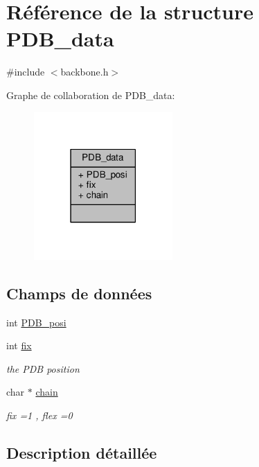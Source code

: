 \hypertarget{struct_p_d_b__data}{\section{Référence de la structure P\+D\+B\+\_\+data}
\label{struct_p_d_b__data}
}


{\ttfamily \#include $<$backbone.\+h$>$}



Graphe de collaboration de P\+D\+B\+\_\+data\+:\nopagebreak
\begin{figure}[H]
\begin{center}
\leavevmode
\includegraphics[width=150pt]{struct_p_d_b__data__coll__graph}
\end{center}
\end{figure}
\subsection*{Champs de données}
\begin{DoxyCompactItemize}
\item 
int \hyperlink{struct_p_d_b__data_adc17445e0eb5d3c7e4834c530b0fb297}{P\+D\+B\+\_\+posi}
\item 
int \hyperlink{struct_p_d_b__data_ad3e7d8ee58824f6b448a65804ad8880d}{fix}
\begin{DoxyCompactList}\small\item\em the P\+D\+B position \end{DoxyCompactList}\item 
char $\ast$ \hyperlink{struct_p_d_b__data_a5537d000cfa82823ec82990183c041a7}{chain}
\begin{DoxyCompactList}\small\item\em fix =1 , flex =0 \end{DoxyCompactList}\end{DoxyCompactItemize}


\subsection{Description détaillée}


